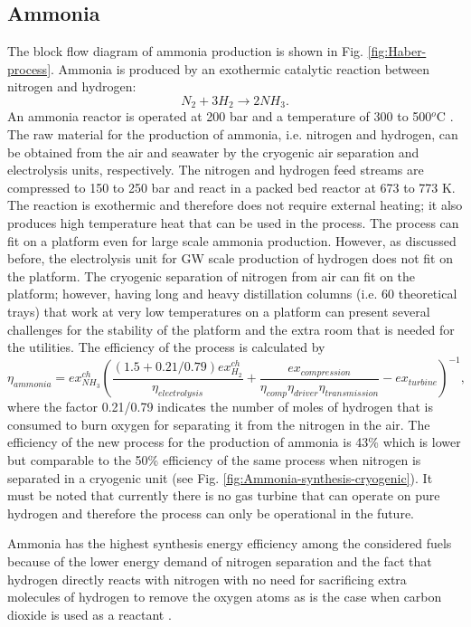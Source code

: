 \documentclass{ECOS_2021}
\begin{document}
\sffamily \subsection{Ammonia}
\normalsize
The block flow diagram of ammonia production is shown in Fig. \ref{fig:Haber-process}.
Ammonia is produced by an exothermic catalytic reaction between nitrogen
and hydrogen:
\[
N_{2}+3H_{2}\rightarrow2NH_{3}.
\]
An ammonia reactor is operated at 200 bar and a temperature of 300
to 500$^{o}$C \cite{elnashaieSimulationOptimizationIndustrial1988,morudAnalysisInstabilityIndustrial1998}.
The raw material for the production of ammonia, i.e. nitrogen and
hydrogen, can be obtained from the air and seawater by the cryogenic
air separation and electrolysis units, respectively. The nitrogen
and hydrogen feed streams are compressed to 150 to 250 bar and react
in a packed bed reactor at 673 to 773 K. The reaction is exothermic
and therefore does not require external heating; it also produces
high temperature heat that can be used in the process. The process
can fit on a platform even for large scale ammonia production. However,
as discussed before, the electrolysis unit for GW scale production
of hydrogen does not fit on the platform. The cryogenic separation
of nitrogen from air can fit on the platform; however, having long
and heavy distillation columns (i.e. 60 theoretical trays) that work
at very low temperatures on a platform can present several challenges
for the stability of the platform and the extra room that is needed
for the utilities. The efficiency of
the process is calculated by
\[
\eta_{ammonia}=ex_{NH_{3}}^{ch}\left(\frac{\left(1.5+0.21/0.79\right)ex_{H_{2}}^{ch}}{\eta_{electrolysis}}+\frac{ex_{compression}}{\eta_{comp}\eta_{driver}\eta_{transmission}}-ex_{turbine}\right)^{-1},
\]
where the factor 0.21/0.79 indicates the number of moles of hydrogen
that is consumed to burn oxygen for separating it from the nitrogen
in the air. The efficiency of the new process for the production of
ammonia is 43\% which is lower but comparable to the 50\% efficiency
of the same process when nitrogen is separated in a cryogenic unit
(see Fig. \ref{fig:Ammonia-synthesis-cryogenic}). It must be noted
that currently there is no gas turbine that can operate on pure hydrogen
and therefore the process can only be operational in the future.

Ammonia has the highest synthesis energy efficiency among the considered
fuels because of the lower energy demand of nitrogen separation and
the fact that hydrogen directly reacts with nitrogen with no need
for sacrificing extra molecules of hydrogen to remove the oxygen atoms
as is the case when carbon dioxide is used as a reactant \cite{elnashaieSimulationOptimizationIndustrial1988}.
\end{document}

